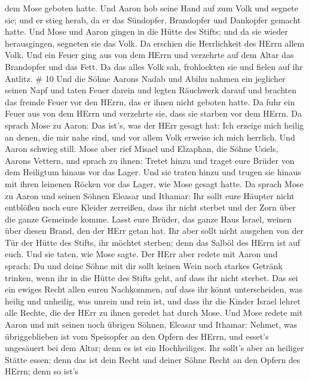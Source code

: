 dem Mose geboten hatte.  Und Aaron hob seine Hand auf zum
Volk und segnete sie; und er stieg herab, da er das Sündopfer,
Brandopfer und Dankopfer gemacht hatte.  Und Mose und Aaron
gingen in die Hütte des Stifts; und da sie wieder herausgingen, segneten
sie das Volk. Da erschien die Herrlichkeit des HErrn allem Volk.
 Und ein Feuer ging aus von dem HErrn und verzehrte auf dem
Altar das Brandopfer und das Fett. Da das alles Volk sah, frohlockten
sie und fielen auf ihr Antlitz. \# 10  Und die Söhne Aarons
Nadab und Abihu nahmen ein jeglicher seinen Napf und taten Feuer darein
und legten Räuchwerk darauf und brachten das fremde Feuer vor den HErrn,
das er ihnen nicht geboten hatte.  Da fuhr ein Feuer aus von
dem HErrn und verzehrte sie, dass sie starben vor dem HErrn.
 Da sprach Mose zu Aaron: Das ist's, was der HErr gesagt
hat: Ich erzeige mich heilig an denen, die mir nahe sind, und vor allem
Volk erweise ich mich herrlich. Und Aaron schwieg still. 
Mose aber rief Misael und Elzaphan, die Söhne Usiels, Aarons Vettern,
und sprach zu ihnen: Tretet hinzu und traget eure Brüder von dem
Heiligtum hinaus vor das Lager.  Und sie traten hinzu und
trugen sie hinaus mit ihren leinenen Röcken vor das Lager, wie Mose
gesagt hatte.  Da sprach Mose zu Aaron und seinen Söhnen
Eleasar und Ithamar: Ihr sollt eure Häupter nicht entblößen noch eure
Kleider zerreißen, dass ihr nicht sterbet und der Zorn über die ganze
Gemeinde komme. Lasst eure Brüder, das ganze Haus Israel, weinen über
diesen Brand, den der HErr getan hat.  Ihr aber sollt nicht
ausgehen von der Tür der Hütte des Stifts, ihr möchtet sterben; denn das
Salböl des HErrn ist auf euch. Und sie taten, wie Mose sagte.
 Der HErr aber redete mit Aaron und sprach:  Du
und deine Söhne mit dir sollt keinen Wein noch starkes Getränk trinken,
wenn ihr in die Hütte des Stifts geht, auf dass ihr nicht sterbet. Das
sei ein ewiges Recht allen euren Nachkommen,  auf dass ihr
könnt unterscheiden, was heilig und unheilig, was unrein und rein ist,
 und dass ihr die Kinder Israel lehret alle Rechte, die der
HErr zu ihnen geredet hat durch Mose.  Und Mose redete mit
Aaron und mit seinen noch übrigen Söhnen, Eleasar und Ithamar: Nehmet,
was übriggeblieben ist vom Speisopfer an den Opfern des HErrn, und
esset's ungesäuert bei dem Altar; denn es ist ein Hochheiliges.
 Ihr sollt's aber an heiliger Stätte essen; denn das ist
dein Recht und deiner Söhne Recht an den Opfern des HErrn; denn so ist's

